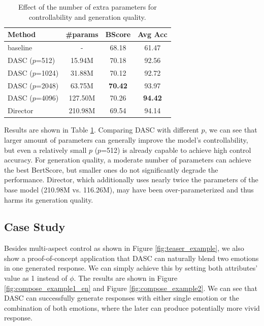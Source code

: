 \begin{table}[th]
    \small
    \centering
    \begin{tabular}{lccc}
    \hline
    Method      & \#params        & BScore         & Avg Acc        \\ \hline
    baseline    & -               & 68.18          & 61.47          \\
    DASC ($p$=512) & 15.94M          & 70.18          & 92.56          \\
    DASC ($p$=1024)& 31.88M          & 70.12          & 92.72          \\
    DASC ($p$=2048) & 63.75M          & \textbf{70.42} & 93.97          \\
    DASC ($p$=4096)& 127.50M         & 70.26          & \textbf{94.42} \\
    Director    & 210.98M         & 69.54          & 94.14          \\ \hline
    \end{tabular}
    \caption{Effect of the number of extra parameters for controllability and generation quality.}
    \label{tab:num_params}
\end{table}

Results are shown in Table \ref{tab:num_params}. Comparing DASC with different $p$, we can see that larger amount of parameters can generally improve the model's controllability, but even a relatively small $p$ ($p$=512) is already capable to achieve high control accuracy. For generation quality, a moderate number of parameters can achieve the best BertScore, but smaller ones do not significantly degrade the performance. Director, which additionally uses nearly twice the parameters of the base model (210.98M vs. 116.26M), may have been over-parameterized and thus harms its generation quality.

\subsection{Case Study}

Besides multi-aspect control as shown in Figure \ref{fig:teaser_example}, we also show a proof-of-concept application that DASC can naturally blend two emotions in one generated response. We can simply achieve this by setting both attributes' value as 1 instead of $\phi$. The results are shown in Figure \ref{fig:compose_example1_en} and Figure \ref{fig:compose_example2}. We can see that DASC can successfully generate responses with either single emotion or the combination of both emotions, where the later can produce potentially more vivid response.

